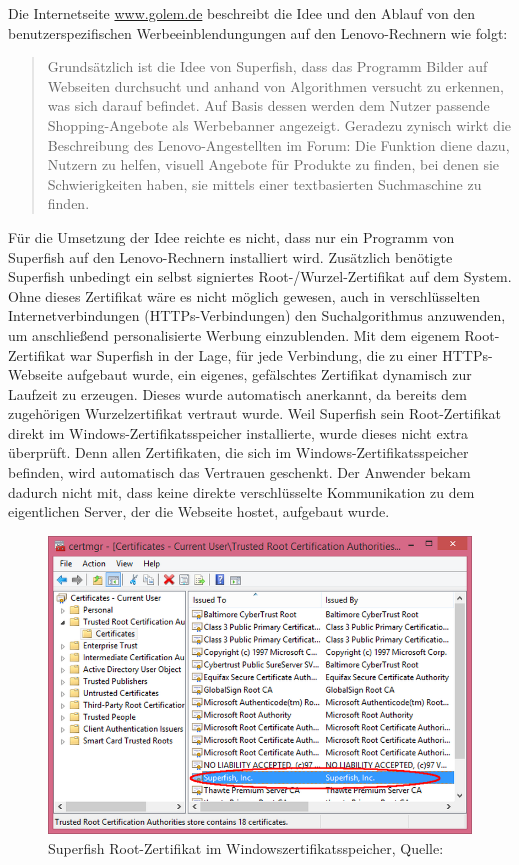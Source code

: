 Die Internetseite \url{www.golem.de} beschreibt die Idee und den Ablauf von den benutzerspezifischen Werbeeinblendungungen auf den Lenovo-Rechnern wie folgt: 
\begin{quote}
	\glqq Grundsätzlich ist die Idee von Superfish, dass das Programm Bilder auf Webseiten durchsucht und anhand von Algorithmen versucht zu erkennen, was sich darauf befindet. Auf Basis dessen werden dem Nutzer passende Shopping-Angebote als Werbebanner angezeigt. Geradezu zynisch wirkt die Beschreibung des Lenovo-Angestellten im Forum: Die Funktion diene dazu, Nutzern zu helfen, visuell Angebote für Produkte zu finden, bei denen sie Schwierigkeiten haben, sie mittels einer textbasierten Suchmaschine zu finden.\grqq \cite{superfish}
\end{quote}
Für die Umsetzung der Idee reichte es nicht, dass nur ein Programm von Superfish auf den Lenovo-Rechnern installiert wird. Zusätzlich benötigte Superfish unbedingt ein selbst signiertes Root-/Wurzel-Zertifikat auf dem System. Ohne dieses Zertifikat wäre es nicht möglich gewesen, auch in verschlüsselten Internetverbindungen (HTTPs-Verbindungen) den Suchalgorithmus anzuwenden, um anschließend personalisierte Werbung einzublenden. Mit dem eigenem Root-Zertifikat war Superfish in der Lage, für jede Verbindung, die zu einer HTTPs-Webseite aufgebaut wurde, ein eigenes, gefälschtes Zertifikat dynamisch zur Laufzeit zu erzeugen. Dieses wurde automatisch anerkannt, da bereits dem zugehörigen Wurzelzertifikat vertraut wurde. Weil Superfish sein Root-Zertifikat direkt im Windows-Zertifikatsspeicher installierte, wurde dieses nicht extra überprüft. Denn allen Zertifikaten, die sich im Windows-Zertifikatsspeicher befinden, wird automatisch das Vertrauen geschenkt. Der Anwender bekam dadurch nicht mit, dass keine direkte verschlüsselte Kommunikation zu dem eigentlichen Server, der die Webseite hostet, aufgebaut wurde. 
\begin{figure}[H]
	\centering
	\includegraphics[width=.9\linewidth]{images/superfish.png}
	\caption{Superfish Root-Zertifikat im Windowszertifikatsspeicher, Quelle: \cite{superfish-bild}}
\end{figure}
